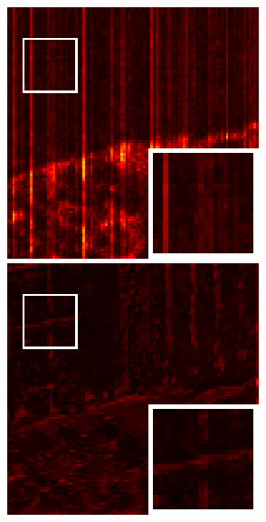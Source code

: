 \begin{figure}[t]
\begin{center}
		
		\vspace{1mm}
		
		\begin{minipage}{0.15\hsize}
			\centerline{\includegraphics[width=\hsize]{./fig_supplement/SAM_map_color_woboundary/Beltsville/sam_map_LRTDTV.eps}} %
		\end{minipage}
		\begin{minipage}{0.15\hsize}
			\centerline{\includegraphics[width=\hsize]{./fig_supplement/SAM_map_color_woboundary/Beltsville/sam_map_FGSLR.eps}} %

\end{minipage}
\end{center}
\end{figure}
